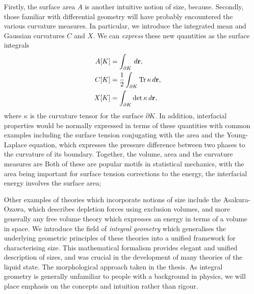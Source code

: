Firstly, the surface area $A$ is another intuitive notion of size, because.
Secondly, those familiar with differential geometry will have probably encountered the various curvature measures.
In particular, we introduce the integrated mean and Gaussian curvatures $C$ and $X$.
We can \emph{express} these new quantities as the surface integrals
\begin{subequations}\label{eq:intrinsic-volumes-surface-integrals}
  \begin{align}
    A[K]
    &=
    \int_{\partial K} \, d\boldsymbol{\mathbf{r}},
    \\
    C[K]
    &=
    \frac{1}{2} \int_{\partial K} \operatorname*{Tr}{\kappa} \, d\boldsymbol{\mathbf{r}},
    \\
    X[K]
    &=
    \int_{\partial K} \det{\kappa} \, d\boldsymbol{\mathbf{r}},
  \end{align}
\end{subequations}
where $\kappa$ is the curvature tensor for the surface $\partial K$.
In addition, interfacial properties would be normally expressed in terms of these quantities with common examples including the surface tension conjugating with the area and the Young-Laplace equation, which expresses the pressure difference between two phases to the curvature of its boundary.
Together, the volume, area and the curvature measures are Both of these are popular motifs in statistical mechanics, with the area being important for surface tension corrections to the energy, the interfacial energy involves the surface area; 

Other examples of theories which incorporate notions of size include the Asakura-Ozawa, which describes depletion forces using exclusion volumes, and more generally any free volume theory which expresses an energy in terms of a volume in space.
We introduce the field of \emph{integral geometry} which generalises the underlying geometric principles of these theories into a unified framework for characterising size.
This mathematical formalism provides elegant and unified description of sizes, and was crucial in the development of many theories of the liquid state.
The morphological approach taken in the thesis.
As integral geometry is generally unfamiliar to people with a background in physics, we will place emphasis on the concepts and intuition rather than rigour.

